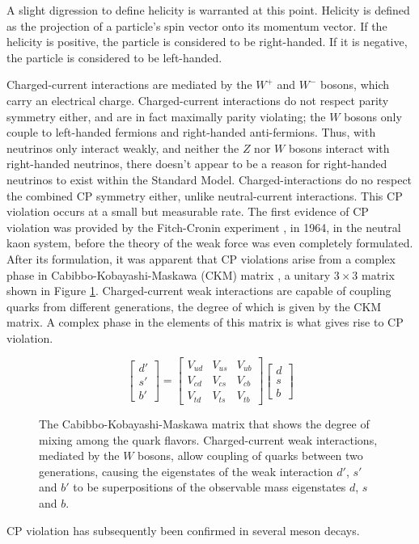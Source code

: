 \documentclass[11pt,a4paper,openright,twoside]{report}
\begin{document}
A slight digression to define helicity is warranted at this point. Helicity is defined as the projection of a particle's spin vector onto its momentum vector. If the helicity is positive, the particle is considered to be right-handed. If it is negative, the particle is considered to be left-handed.

Charged-current interactions are mediated by the $W^+$ and $W^-$ bosons, which carry an electrical charge. Charged-current interactions do not respect parity symmetry either, and are in fact maximally parity violating; the $W$ bosons only couple to left-handed fermions and right-handed anti-fermions. Thus, with neutrinos only interact weakly, and neither the $Z$ nor $W$ bosons interact with right-handed neutrinos, there doesn't appear to be a reason for right-handed neutrinos to exist within the Standard Model. Charged-interactions do no respect the combined CP symmetry either, unlike neutral-current interactions. This CP violation occurs at a small but measurable rate. The first evidence of CP violation was provided by the Fitch-Cronin experiment \cite{cronin_fitch}, in 1964, in the neutral kaon system, before the theory of the weak force was even completely formulated. After its formulation, it was apparent that CP violations arise from a complex phase in Cabibbo-Kobayashi-Maskawa (CKM) matrix \cite{CKM}, a unitary $3\times 3$ matrix shown in Figure \ref{fig:CKM matrix}. Charged-current weak interactions are capable of coupling quarks from different generations, the degree of which is given by the CKM matrix. A complex phase in the elements of this matrix is what gives rise to CP violation.
\begin{figure}[H]
\[
\begin{bmatrix}
d'\\
s'\\
b'
\end{bmatrix}
=
\begin{bmatrix}
V_{ud} & V_{us} & V_{ub}\\
V_{cd} & V_{cs} & V_{cb}\\
V_{td} & V_{ts} & V_{tb}
\end{bmatrix}
\begin{bmatrix}
d\\
s\\
b
\end{bmatrix}
\]
\caption{The Cabibbo-Kobayashi-Maskawa matrix that shows the degree of mixing among the quark flavors. Charged-current weak interactions, mediated by the $W$ bosons, allow coupling of quarks between two generations, causing the eigenstates of the weak interaction $d'$, $s'$ and $b'$ to be superpositions of the observable mass eigenstates $d$, $s$ and $b$.}
\label{fig:CKM matrix}
\end{figure}
CP violation has subsequently been confirmed in several meson decays\cite{CP1,CP2,CP3,CP4,CP5,CP6}.
\end{document}
